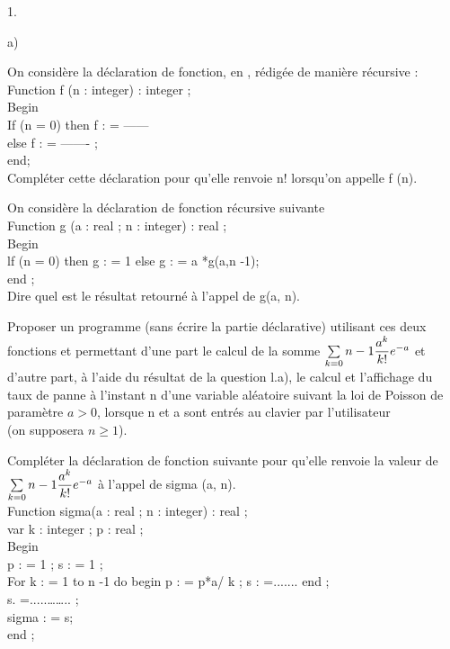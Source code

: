 \documentclass[11pt]{article}%
\begin{document}
\begin{noliste}{1.}
\item 

\begin{noliste}{a)}
 \setlength{\itemsep}{2mm}
\item On considère la déclaration de fonction, en \Scilab{}, rédigée de
manière
récursive : \\
Function f (n : integer) : integer ;\\
Begin \\
If (n = 0) then f : = ------ \\
else f : = ------- ;\\
end;\\
Compléter cette déclaration pour qu'elle renvoie n! lorsqu'on appelle f
(n).

\item On considère la déclaration de fonction récursive suivante \\
Function g (a : real ; n : integer) : real ;\\
Begin \\
lf (n = 0) then g : = 1 else g : = a *g(a,n -1); \\
end ;\\
Dire quel est le résultat retourné à l'appel de g(a, n).

\item Proposer un programme (sans écrire la partie déclarative)
utilisant
ces deux fonctions et permettant d'une part le calcul de la somme $
\sum\limits_{k = 0}{n-1}\dfrac{a^{k}}{k!}e^{-a}$ et d'autre part, à
l'aide
du résultat de la question l.a), le calcul et l'affichage du taux de
panne à
l'instant n d'une variable aléatoire suivant la loi de Poisson de
paramètre $
a>0$, lorsque n et a sont entrés au clavier par l'utilisateur \\
(on supposera $n\geq 1$).

\item Compléter la déclaration de fonction suivante pour qu'elle
renvoie la
valeur de $\sum\limits_{k = 0}{n-1}\dfrac{a^{k}}{k!}e^{-a}$ à l'appel
de
sigma (a, n).\\
Function sigma(a : real ; n : integer) : real ;\\
var k : integer ; p : real ;\\
Begin \\
p : = 1 ; s : = 1 ; \\
For k : = 1 to n -1 do begin p : = p*a/ k ; s : =....... end ; \\
s. =.....\dots \dots.. ; \\
sigma : = s;\\
end ;
\end{noliste}
\end{noliste}
\end{document}
